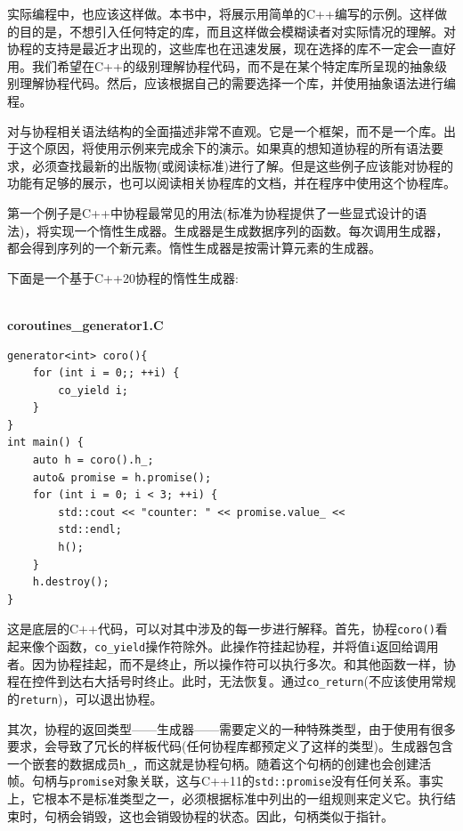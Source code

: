 实际编程中，也应该这样做。本书中，将展示用简单的C++编写的示例。这样做的目的是，不想引入任何特定的库，而且这样做会模糊读者对实际情况的理解。对协程的支持是最近才出现的，这些库也在迅速发展，现在选择的库不一定会一直好用。我们希望在C++的级别理解协程代码，而不是在某个特定库所呈现的抽象级别理解协程代码。然后，应该根据自己的需要选择一个库，并使用抽象语法进行编程。

对与协程相关语法结构的全面描述非常不直观。它是一个框架，而不是一个库。出于这个原因，将使用示例来完成余下的演示。如果真的想知道协程的所有语法要求，必须查找最新的出版物(或阅读标准)进行了解。但是这些例子应该能对协程的功能有足够的展示，也可以阅读相关协程库的文档，并在程序中使用这个协程库。


第一个例子是C++中协程最常见的用法(标准为协程提供了一些显式设计的语法)，将实现一个惰性生成器。生成器是生成数据序列的函数。每次调用生成器，都会得到序列的一个新元素。惰性生成器是按需计算元素的生成器。

下面是一个基于C++20协程的惰性生成器:

\hspace*{\fill} \\ %
\noindent
\textbf{coroutines\_generator1.C}
\begin{lstlisting}[style=styleCXX]
generator<int> coro(){
	for (int i = 0;; ++i) {
		co_yield i;
	}
}
int main() {
	auto h = coro().h_;
	auto& promise = h.promise();
	for (int i = 0; i < 3; ++i) {
		std::cout << "counter: " << promise.value_ << 
		std::endl;
		h();
	}
	h.destroy();
}
\end{lstlisting}

这是底层的C++代码，可以对其中涉及的每一步进行解释。首先，协程\texttt{coro()}看起来像个函数，\texttt{co\_yield}操作符除外。此操作符挂起协程，并将值\texttt{i}返回给调用者。因为协程挂起，而不是终止，所以操作符可以执行多次。和其他函数一样，协程在控件到达右大括号时终止。此时，无法恢复。通过\texttt{co\_return}(不应该使用常规的\texttt{return})，可以退出协程。

其次，协程的返回类型——生成器——需要定义的一种特殊类型，由于使用有很多要求，会导致了冗长的样板代码(任何协程库都预定义了这样的类型)。生成器包含一个嵌套的数据成员\texttt{h\_}，而这就是协程句柄。随着这个句柄的创建也会创建活帧。句柄与\texttt{promise}对象关联，这与C++11的\texttt{std::promise}没有任何关系。事实上，它根本不是标准类型之一，必须根据标准中列出的一组规则来定义它。执行结束时，句柄会销毁，这也会销毁协程的状态。因此，句柄类似于指针。

